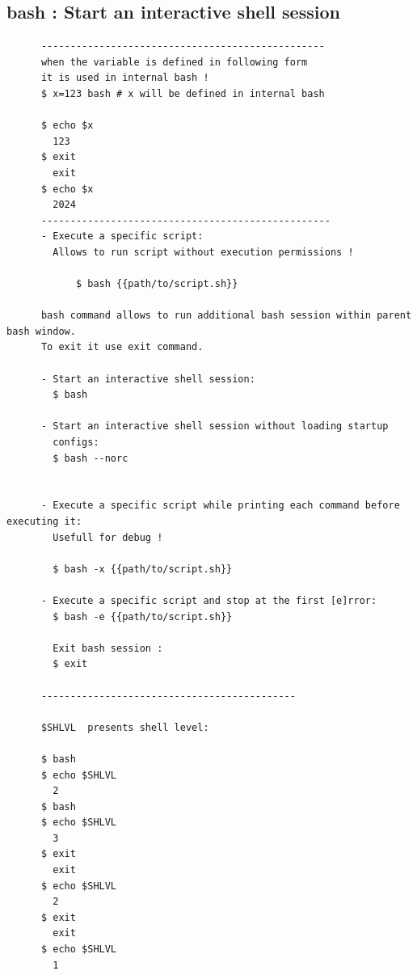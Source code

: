 \documentclass[a4paper,12pt]{article}
\begin{document}
\subsection{bash   : Start an interactive shell session }
\begin{verbatim}
      -------------------------------------------------
      when the variable is defined in following form
      it is used in internal bash !       
      $ x=123 bash # x will be defined in internal bash
                   
      $ echo $x
        123
      $ exit
        exit
      $ echo $x
        2024
      --------------------------------------------------
      - Execute a specific script: 
        Allows to run script without execution permissions !
         
            $ bash {{path/to/script.sh}}      
      
      bash command allows to run additional bash session within parent bash window. 
      To exit it use exit command.

      - Start an interactive shell session:
        $ bash

      - Start an interactive shell session without loading startup   
        configs:
        $ bash --norc


      - Execute a specific script while printing each command before executing it:
        Usefull for debug !
        
        $ bash -x {{path/to/script.sh}}

      - Execute a specific script and stop at the first [e]rror:
        $ bash -e {{path/to/script.sh}}

        Exit bash session : 
        $ exit      
      
      --------------------------------------------
      
      $SHLVL  presents shell level:
﻿
      $ bash
      $ echo $SHLVL
        2
      $ bash
      $ echo $SHLVL
        3
      $ exit
        exit
      $ echo $SHLVL
        2
      $ exit
        exit
      $ echo $SHLVL
        1

\end{verbatim}
\end{document}
